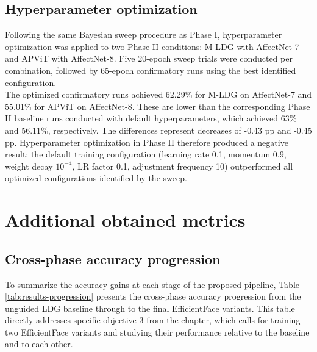 \subsection{Hyperparameter optimization}
\label{section:results-phase2-optim}

Following the same Bayesian sweep procedure as Phase I, hyperparameter optimization was applied to two Phase II conditions: M-LDG with AffectNet-7 and APViT with AffectNet-8. Five 20-epoch sweep trials were conducted per combination, followed by 65-epoch confirmatory runs using the best identified configuration.\\

The optimized confirmatory runs achieved 62.29\% for M-LDG on AffectNet-7 and 55.01\% for APViT on AffectNet-8. These are lower than the corresponding Phase II baseline runs conducted with default hyperparameters, which achieved 63\% and 56.11\%, respectively. The differences represent decreases of -0.43 pp and -0.45 pp. Hyperparameter optimization in Phase II therefore produced a negative result: the default training configuration (learning rate 0.1, momentum 0.9, weight decay $10^{-4}$, LR factor 0.1, adjustment frequency 10) outperformed all optimized configurations identified by the sweep.

\section{Additional obtained metrics}
\label{section:results-metrics}

\subsection{Cross-phase accuracy progression}
\label{section:results-metrics-progression}

To summarize the accuracy gains at each stage of the proposed pipeline, Table \ref{tab:results-progression} presents the cross-phase accuracy progression from the unguided LDG baseline through to the final EfficientFace variants. This table directly addresses specific objective 3 from the  chapter, which calls for training two EfficientFace variants and studying their performance relative to the baseline and to each other.\\

